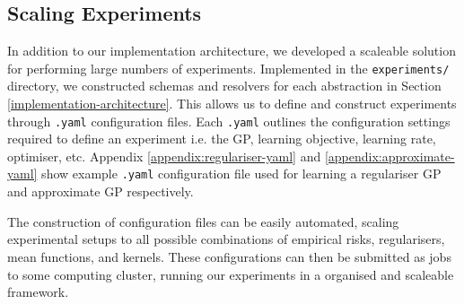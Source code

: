 \documentclass{article}
\def\code#1{\texttt{#1}}
\numberwithin{equation}{section}
\begin{document}
\subsection{Scaling Experiments}
In addition to our implementation architecture, we developed a scaleable solution for performing large numbers of experiments.
Implemented in the \code{experiments/} directory, we constructed schemas and resolvers for each abstraction in Section \ref{implementation-architecture}.
This allows us to define and construct experiments through \code{.yaml} configuration files.
Each \code{.yaml} outlines the configuration settings required to define an experiment i.e. the GP, learning objective, learning rate, optimiser, etc. Appendix \ref{appendix:regulariser-yaml} and \ref{appendix:approximate-yaml} show example \code{.yaml} configuration file used for learning a regulariser GP and approximate GP respectively.

The construction of configuration files can be easily automated, scaling experimental setups to all possible combinations of empirical risks, regularisers, mean functions, and kernels. These configurations can then be submitted as jobs to some computing cluster, running our experiments in a organised and scaleable framework.
\end{document}
